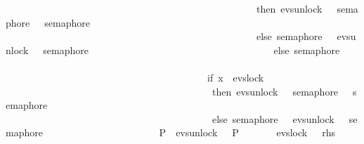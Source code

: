 \begin{isabellebody}
\ \ \ \ \ \ \ \ \ \ \ \ \ \ \ \ \ \ \ \ \ \ \ \ \ \ \ \ \ \ \ \ \ \ \ \ \ \ \ \ \ \ \ \ \ \ \ \ \ \ \ then\ evs{\isachardot}{\kern0pt}unlock\ {}\ {\isasymrightarrow}\ semaphore\ {}\ {\isacharbar}{\kern0pt}{\isacharbar}{\kern0pt}{\isacharbar}{\kern0pt}\ semaphore\ {}\isanewline
\ \ \ \ \ \ \ \ \ \ \ \ \ \ \ \ \ \ \ \ \ \ \ \ \ \ \ \ \ \ \ \ \ \ \ \ \ \ \ \ \ \ \ \ \ \ \ \ \ \ \ else\ semaphore\ {}\ {\isacharbar}{\kern0pt}{\isacharbar}{\kern0pt}{\isacharbar}{\kern0pt}\ evs{\isachardot}{\kern0pt}unlock\ {}\ {\isasymrightarrow}\ semaphore\ {}{\isacharparenright}{\kern0pt}\isanewline
\ \ \ \ \ \ \ \ \ \ \ \ \ \ \ \ \ \ \ \ \ \ \ \ \ \ \ \ \ \ \ \ \ \ \ \ else\ semaphore\ {}\ \isanewline
\ \ \ \ \ \ \ \ \ \ \ \ \ \ \ \ \ \ \ \ \ \ \ \ \ \ \ \ \ \ \ \ \ \ \ \ \ \ \ \ \ {\isacharbar}{\kern0pt}{\isacharbar}{\kern0pt}{\isacharbar}{\kern0pt}\ \isanewline
\ \ \ \ \ \ \ \ \ \ \ \ \ \ \ \ \ \ \ \ \ \ \ \ \ \ \ \ \ \ \ \ \ \ \ \ \ \ \ \ \ {\isacharparenleft}{\kern0pt}if\ x\ {\isacharequal}{\kern0pt}\ evs{\isachardot}{\kern0pt}lock\ {}\ \isanewline
\ \ \ \ \ \ \ \ \ \ \ \ \ \ \ \ \ \ \ \ \ \ \ \ \ \ \ \ \ \ \ \ \ \ \ \ \ \ \ \ \ \ then\ evs{\isachardot}{\kern0pt}unlock\ {}\ {\isasymrightarrow}\ semaphore\ {}\ {\isacharbar}{\kern0pt}{\isacharbar}{\kern0pt}{\isacharbar}{\kern0pt}\ semaphore\ {}\isanewline
\ \ \ \ \ \ \ \ \ \ \ \ \ \ \ \ \ \ \ \ \ \ \ \ \ \ \ \ \ \ \ \ \ \ \ \ \ \ \ \ \ \ else\ semaphore\ {}\ {\isacharbar}{\kern0pt}{\isacharbar}{\kern0pt}{\isacharbar}{\kern0pt}\ evs{\isachardot}{\kern0pt}unlock\ {}\ {\isasymrightarrow}\ semaphore\ {}{\isacharparenright}{\kern0pt}{\isacharparenright}{\kern0pt}{\isacharparenright}{\kern0pt}\ \isanewline
\ \ \ \ \ \ \ \ \ \ \ \ \ \ \ \ \ \ \ \ {\isacharbar}{\kern0pt}{\isacharbar}{\kern0pt}\ {\isacharparenleft}{\kern0pt}P{}\ {\isacharbar}{\kern0pt}{\isacharbar}{\kern0pt}{\isacharbar}{\kern0pt}\ evs{\isachardot}{\kern0pt}unlock\ {}\ {\isasymrightarrow}\ P{}{\isacharparenright}{\kern0pt}{\isacharparenright}{\kern0pt}{\isachardoublequoteclose}\isanewline
\ \ \ \ {\isacharparenleft}{\kern0pt}\ {\isachardoublequoteopen}{\isacharunderscore}{\kern0pt}\ {\isacharequal}{\kern0pt}\ evs{\isachardot}{\kern0pt}lock\ {}\ {\isasymrightarrow}\ {\isacharquery}{\kern0pt}rhs{\isacharprime}{\kern0pt}{\isachardoublequoteclose}{\isacharparenright}{\kern0pt}\isanewline
\ \ \ \ \ \ \ \ \ \ \isamarkupfalse%

\end{isabellebody}
